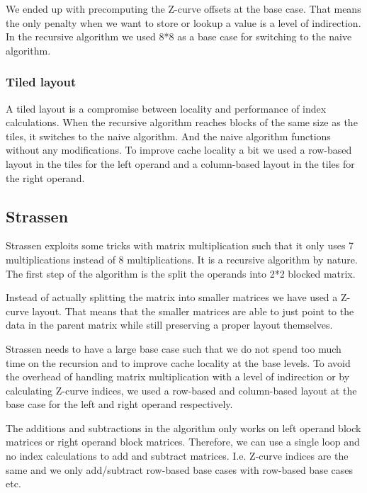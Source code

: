 We ended up with precomputing the Z-curve offsets at the base case. That means the only penalty when we want to store or lookup a value is a level of indirection. In the recursive algorithm we used 8*8 as a base case for switching to the naive algorithm.

\subsubsection{Tiled layout}

A tiled layout is a compromise between locality and performance of index calculations. When the recursive algorithm reaches blocks of the same size as the tiles, it switches to the naive algorithm. And the naive algorithm functions without any modifications. To improve cache locality a bit we used a row-based layout in the tiles for the left operand and a column-based layout in the tiles for the right operand.

\subsection{Strassen}

Strassen exploits some tricks with matrix multiplication such that it only uses 7 multiplications instead of 8 multiplications. It is a recursive algorithm by nature. The first step of the algorithm is the split the operands into 2*2 blocked matrix.

Instead of actually splitting the matrix into smaller matrices we have used a Z-curve layout. That means that the smaller matrices are able to just point to the data in the parent matrix while still preserving a proper layout themselves.

Strassen needs to have a large base case such that we do not spend too much time on the recursion and to improve cache locality at the base levels. To avoid the overhead of handling matrix multiplication with a level of indirection or by calculating Z-curve indices, we used a row-based and column-based layout at the base case for the left and right operand respectively.

The additions and subtractions in the algorithm only works on left operand block matrices or right operand block matrices. Therefore, we can use a single loop and no index calculations to add and subtract matrices. I.e. Z-curve indices are the same and we only add/subtract row-based base cases with row-based base cases etc.


